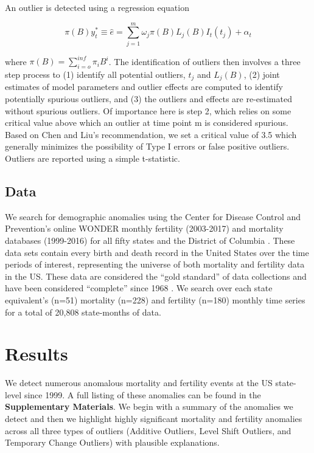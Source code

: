 \documentclass[12pt]{article}
\begin{document}
An outlier is detected using a regression equation

\[ \pi(B)y_t^* \equiv \hat{e} = \sum_{j=1}^m \omega_j \pi(B)L_j(B)I_t(t_j) + \alpha_t \]

where \(\pi(B)=\sum_{i=o}^{inf} \pi_iB^i\). The identification of
outliers then involves a three step process to (1) identify all
potential outliers, \(t_j\) and \(L_j (B)\), (2) joint estimates of
model parameters and outlier effects are computed to identify
potentially spurious outliers, and (3) the outliers and effects are
re-estimated without spurious outliers. Of importance here is step 2,
which relies on some critical value above which an outlier at time point
m is considered spurious. Based on Chen and Liu's
\citeyearpar{chen1993joint} recommendation, we set a critical value of
3.5 which generally minimizes the possibility of Type I errors or false
positive outliers. Outliers are reported using a simple t-statistic.

\hypertarget{data}{%
\subsection{Data}\label{data}}

We search for demographic anomalies using the Center for Disease Control
and Prevention's online WONDER monthly fertility (2003-2017) and
mortality databases (1999-2016) for all fifty states and the District of
Columbia \citep{CDC_fert07, CDC_mort}. These data sets contain every
birth and death record in the United States over the time periods of
interest, representing the universe of both mortality and fertility data
in the US. These data are considered the ``gold standard'' of data
collections \citep{mahapatra2007civil} and have been considered
``complete'' since 1968 \citep{hetzel2016us}. We search over each state
equivalent's (n=51) mortality (n=228) and fertility (n=180) monthly time
series for a total of 20,808 state-months of data.

\hypertarget{results}{%
\section{Results}\label{results}}

We detect numerous anomalous mortality and fertility events at the US
state-level since 1999. A full listing of these anomalies can be found
in the \textbf{Supplementary Materials}. We begin with a summary of the
anomalies we detect and then we highlight highly significant mortality
and fertility anomalies across all three types of outliers (Additive
Outliers, Level Shift Outliers, and Temporary Change Outliers) with
plausible explanations.
\end{document}
